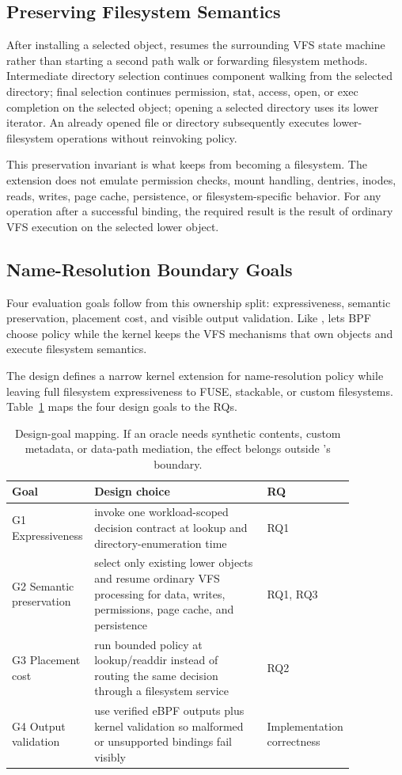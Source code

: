 \subsection{Preserving Filesystem Semantics}

After installing a selected object, \namei resumes the surrounding VFS state machine rather than
starting a second path walk or forwarding filesystem methods. Intermediate
directory selection continues component walking from the selected directory;
final selection continues permission, stat, access, open, or exec completion
on the selected object; opening a selected directory uses its lower iterator.
An already opened file or directory subsequently executes lower-filesystem
operations without reinvoking policy.

This preservation invariant is what keeps \namei from becoming a filesystem.
The extension does not emulate permission checks, mount handling, dentries,
inodes, reads, writes, page cache, persistence, or filesystem-specific
behavior. For any operation after a successful binding, the required result is
the result of ordinary VFS execution on the selected lower object.

\subsection{Name-Resolution Boundary Goals}

Four evaluation goals follow from this ownership split: expressiveness,
semantic preservation, placement cost, and visible output validation. Like
, \namei lets BPF choose policy while the kernel keeps the VFS
mechanisms that own objects and execute filesystem semantics.

The design defines a narrow kernel extension for name-resolution policy while
leaving full filesystem expressiveness to FUSE, stackable, or custom
filesystems. Table~\ref{tab:req-design} maps the four design goals to the RQs.

\begin{table}[t]
\centering
\scriptsize
\begin{tabular}{@{}p{0.19\linewidth}p{0.5\linewidth}p{0.17\linewidth}@{}}
\hline
Goal & Design choice & RQ \\
\hline
G1 Expressiveness & invoke one workload-scoped decision contract at lookup and directory-enumeration time & RQ1 \\
G2 Semantic preservation & select only existing lower objects and resume ordinary VFS processing for data, writes, permissions, page cache, and persistence & RQ1, RQ3 \\
G3 Placement cost & run bounded policy at lookup/readdir instead of routing the same decision through a filesystem service & RQ2 \\
G4 Output validation & use verified eBPF outputs plus kernel validation so malformed or unsupported bindings fail visibly & Implementation correctness \\
\hline
\end{tabular}
\caption{Design-goal mapping. If an oracle needs synthetic contents, custom
metadata, or data-path mediation, the effect belongs outside \namei's
boundary.}
\label{tab:req-design}
\end{table}

